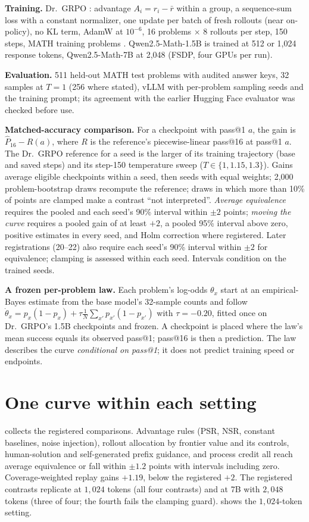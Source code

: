 \documentclass{article}
\theoremstyle{plain}
\begin{document}
\textbf{Training.} Dr.\ GRPO \citep{liu2025drgrpo}: advantage $A_i=r_i-\bar r$ within a group, a sequence-sum loss with a constant normalizer, one update per batch of fresh rollouts (near on-policy), no KL term, AdamW at $10^{-6}$, 16 problems $\times$ 8 rollouts per step, 150 steps, MATH training problems \citep{hendrycks2021math}. Qwen2.5-Math-1.5B \citep{yang2024qwen25math} is trained at 512 or 1,024 response tokens, Qwen2.5-Math-7B at 2,048 (FSDP, four GPUs per run).

\textbf{Evaluation.} 511 held-out MATH test problems with audited answer keys, 32 samples at $T=1$ (256 where stated), vLLM with per-problem sampling seeds and the training prompt; its agreement with the earlier Hugging Face evaluator was checked before use.

\textbf{Matched-accuracy comparison.} For a checkpoint with pass@1 $a$, the gain is $\widehat P_{16}-R(a)$, where $R$ is the reference's piecewise-linear pass@16 at pass@1 $a$. The Dr.\ GRPO reference for a seed is the larger of its training trajectory (base and saved steps) and its step-150 temperature sweep ($T\in\{1,1.15,1.3\}$). Gains average eligible checkpoints within a seed, then seeds with equal weights; 2,000 problem-bootstrap draws recompute the reference; draws in which more than 10\% of points are clamped make a contrast ``not interpreted''. \emph{Average equivalence} requires the pooled and each seed's 90\% interval within $\pm2$ points; \emph{moving the curve} requires a pooled gain of at least $+2$, a pooled 95\% interval above zero, positive estimates in every seed, and Holm correction where registered. Later registrations (20--22) also require each seed's 90\% interval within $\pm2$ for equivalence; clamping is assessed within each seed. Intervals condition on the trained seeds.

\textbf{A frozen per-problem law.} Each problem's log-odds $\theta_x$ start at an empirical-Bayes estimate from the base model's 32-sample counts and follow $\dot\theta_x=p_x(1-p_x)+\tau\frac1N\sum_{x'}p_{x'}(1-p_{x'})$ with $\tau=-0.20$, fitted once on Dr.\ GRPO's 1.5B checkpoints and frozen. A checkpoint is placed where the law's mean success equals its observed pass@1; pass@16 is then a prediction. The law describes the curve \emph{conditional on pass@1}; it does not predict training speed or endpoints.

\section{One curve within each setting}\label{sec:curve}
 collects the registered comparisons. Advantage rules (PSR, NSR, constant baselines, noise injection), rollout allocation by frontier value and its controls, human-solution and self-generated prefix guidance, and process credit all reach average equivalence or fall within $\pm1.2$ points with intervals including zero. Coverage-weighted replay gains $+1.19$, below the registered $+2$. The registered contrasts replicate at $1{,}024$ tokens (all four contrasts) and at 7B with $2{,}048$ tokens (three of four; the fourth fails the clamping guard).  shows the $1{,}024$-token setting.
\end{document}
